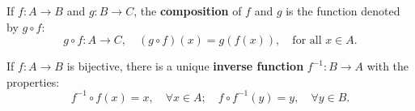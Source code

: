 If $f: A \to B$ and $g: B \to C$, the \textbf{composition} of $f$ and $g$ is the function denoted by $g \circ f$:
$$g \circ f: A \to C, \quad (g \circ f)(x) = g(f(x)), \quad \text{for all } x \in A.$$

If $f: A \to B$ is bijective, there is a unique \textbf{inverse function} $f^{-1}: B \to A$ with the properties:
$$f^{-1} \circ f(x) = x, \quad \forall x \in A; \quad f \circ f^{-1}(y) = y, \quad \forall y \in B.$$
